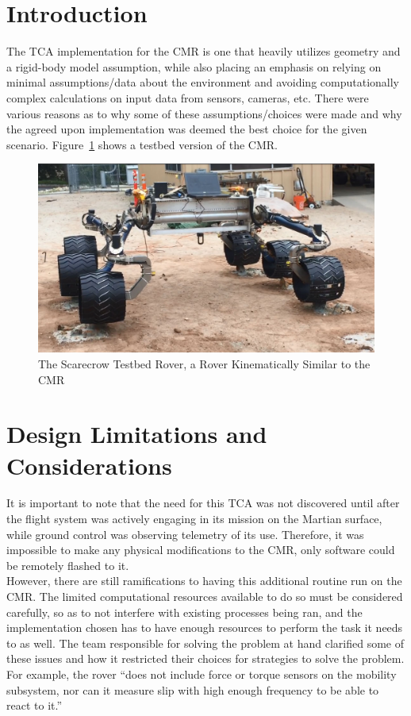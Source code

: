 \section{Introduction}
The \ac{TCA} implementation for the \ac{CMR} is one that heavily utilizes geometry and a rigid-body model assumption, while also placing an emphasis on relying on minimal assumptions/data about the environment and avoiding computationally complex calculations on input data from sensors, cameras, etc. There were various reasons as to why some of these assumptions/choices were made and why the agreed upon implementation was deemed the best choice for the given scenario. \cite{tractl} Figure~\ref{traction_control:algorithms:scarecrow} shows a testbed version of the \ac{CMR}.

\begin{figure}[htbp]
	\centering
	\includegraphics[width=.9\textwidth]{sections/algorithms/images/scarecrow_testbed.png}
	\caption{The Scarecrow Testbed Rover, a Rover Kinematically Similar to the \acl{CMR} \cite{tractl}}
	\label{traction_control:algorithms:scarecrow}
\end{figure}

\section{Design Limitations and Considerations}
It is important to note that the need for this \ac{TCA} was not discovered until after the flight system was actively engaging in its mission on the Martian surface, while ground control was observing telemetry of its use. Therefore, it was impossible to make any physical modifications to the \ac{CMR}, only software could be remotely flashed to it. \\

However, there are still ramifications to having this additional routine run on the \ac{CMR}. The limited computational resources available to do so must be considered carefully, so as to not interfere with existing processes being ran, and the implementation chosen has to have enough resources to perform the task it needs to as well. The team responsible for solving the problem at hand clarified some of these issues and how it restricted their choices for strategies to solve the problem. For example, the rover ``does not include force or torque sensors on the mobility subsystem, nor can it measure slip with high enough frequency to be able to react to it.'' \cite{tractl} \\


